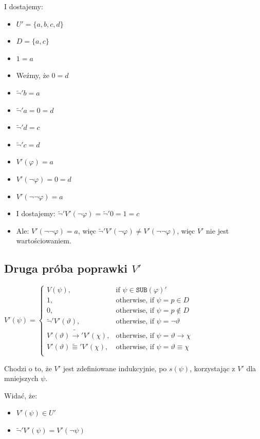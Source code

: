 \documentclass{article}
\theoremstyle{definition}
\theoremstyle{definition}
\theoremstyle{definition}
\newcommand*{\id}{\equiv}
\newcommand*{\ra}{\rightarrow}
\newcommand*{\SUB}{\texttt{SUB}}
\begin{document}
I dostajemy:
\begin{itemize}
  \item $U' = \{a, b, c, d\}$
  \item $D = \{a, c \}$
  \item $1 = a$
  \item Weźmy, że $0 = d$
  \item $\tilde{\lnot}'b = a$
  \item $\tilde{\lnot}'a = 0 = d$
  \item $\tilde{\lnot}'d = c$
  \item $\tilde{\lnot}'c = d$
  \item $V'(\varphi) = a$
  \item $V'(\lnot \varphi) = 0 = d$
  \item $V'(\lnot \lnot \varphi) = a$
  \item I dostajemy: $\tilde{\lnot}'V'(\lnot \varphi) = \tilde{\lnot}' 0 = 1 = c$
  \item Ale: $V'(\lnot \lnot \varphi) = a$, więc $\tilde{\lnot}'V'(\lnot \varphi) \not
          = V'(\lnot \lnot \varphi)$, więc $V'$ nie jest wartościowaniem.
\end{itemize}

\subsection*{Druga próba poprawki $V'$}

$V'(\psi) = \begin{cases}
    V(\psi) ,                          & \text{if } \psi \in \SUB(\varphi)'              \\
    1,                                 & \text{otherwise, if } \psi = p \in D            \\
    0,                                 & \text{otherwise, if } \psi = p \not \in D       \\
    \tilde{\lnot}'V'(\vartheta),       & \text{otherwise, if } \psi = \lnot \vartheta    \\
    V'(\vartheta)\tilde{\ra}'V'(\chi), & \text{otherwise, if } \psi = \vartheta \ra \chi \\
    V'(\vartheta)\tilde{\id}'V'(\chi), & \text{otherwise, if } \psi = \vartheta \id \chi \\
  \end{cases}$

Chodzi o to, że $V'$ jest zdefiniowane indukcyjnie, po $s(\psi)$, korzystając z $V'$ dla mniejszych $\psi$.

Widać, że:
\begin{itemize}
  \item $V'(\psi) \in U'$
  \item $\tilde{\lnot}'V'(\psi) = V'(\lnot \psi)$
\end{itemize}
\end{document}
